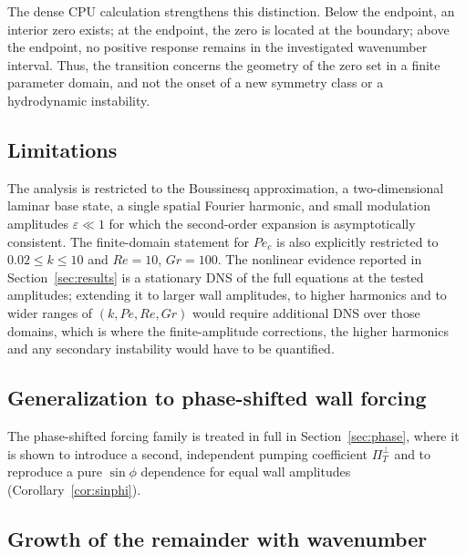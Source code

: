 \documentclass[12pt,a4paper]{article}
\newcommand{\Rey}{\mathit{Re}}
\newcommand{\Pe}{\mathit{Pe}}
\newcommand{\Grr}{\mathit{Gr}}
\newcommand{\PiT}{\Pi_T}
\begin{document}
The dense CPU calculation strengthens this distinction. Below the endpoint,
an interior zero exists; at the endpoint, the zero is located at the boundary;
above the endpoint, no positive response remains in the investigated
wavenumber interval. Thus, the transition concerns the geometry of the zero set in a finite parameter domain, and not the onset of a new
symmetry class or a hydrodynamic instability.

\subsection{Limitations}

The analysis is restricted to the Boussinesq approximation, a two-dimensional laminar base state,
a single spatial Fourier harmonic, and small modulation amplitudes $\varepsilon\ll1$ for which the
second-order expansion is asymptotically consistent. The finite-domain statement for $\Pe_c$ is also
explicitly restricted to $0.02\le k\le10$ and $\Rey=10$, $\Grr=100$. The nonlinear evidence reported in
Section~\ref{sec:results} is a stationary DNS of the full equations at the tested
amplitudes; extending it
to larger wall amplitudes, to higher harmonics and to wider ranges of $(k,\Pe,\Rey,\Grr)$ would require
additional DNS over those domains, which is where the finite-amplitude corrections, the higher harmonics
and any secondary instability would have to be quantified.

\subsection{Generalization to phase-shifted wall forcing}

The phase-shifted forcing family is treated in full in Section~\ref{sec:phase}, where it is
shown to introduce a second, independent pumping coefficient $\PiT^{\perp}$ and to reproduce a
pure $\sin\phi$ dependence for equal wall amplitudes (Corollary~\ref{cor:sinphi}).

\subsection{Growth of the remainder with wavenumber}
\label{subsec:remainder}
\end{document}
